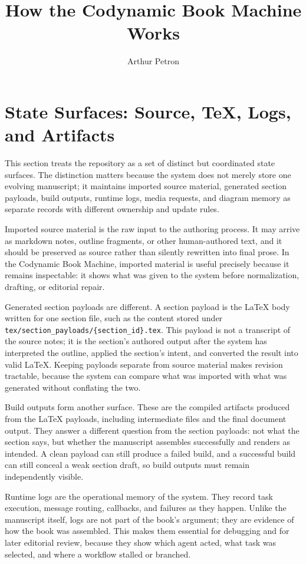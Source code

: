\documentclass[11pt]{article}
\title{How the Codynamic Book Machine Works}
\author{Arthur Petron}
\begin{document}
\section*{State Surfaces: Source, TeX, Logs, and Artifacts}

This section treats the repository as a set of distinct but coordinated state surfaces. The distinction matters because the system does not merely store one evolving manuscript; it maintains imported source material, generated section payloads, build outputs, runtime logs, media requests, and diagram memory as separate records with different ownership and update rules.

Imported source material is the raw input to the authoring process. It may arrive as markdown notes, outline fragments, or other human-authored text, and it should be preserved as source rather than silently rewritten into final prose. In the Codynamic Book Machine, imported material is useful precisely because it remains inspectable: it shows what was given to the system before normalization, drafting, or editorial repair.

Generated section payloads are different. A section payload is the \LaTeX{} body written for one section file, such as the content stored under \texttt{tex/section\_payloads/\{section\_id\}.tex}. This payload is not a transcript of the source notes; it is the section's authored output after the system has interpreted the outline, applied the section's intent, and converted the result into valid \LaTeX{}. Keeping payloads separate from source material makes revision tractable, because the system can compare what was imported with what was generated without conflating the two.

Build outputs form another surface. These are the compiled artifacts produced from the \LaTeX{} payloads, including intermediate files and the final document output. They answer a different question from the section payloads: not what the section says, but whether the manuscript assembles successfully and renders as intended. A clean payload can still produce a failed build, and a successful build can still conceal a weak section draft, so build outputs must remain independently visible.

Runtime logs are the operational memory of the system. They record task execution, message routing, callbacks, and failures as they happen. Unlike the manuscript itself, logs are not part of the book's argument; they are evidence of how the book was assembled. This makes them essential for debugging and for later editorial review, because they show which agent acted, what task was selected, and where a workflow stalled or branched.
\end{document}
